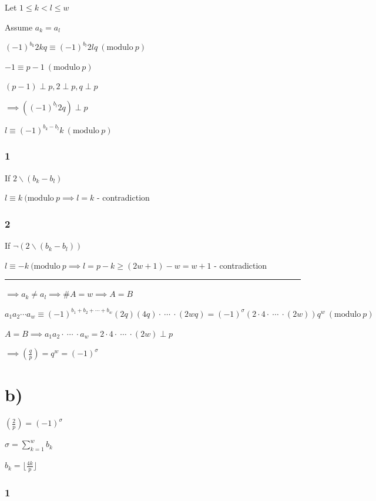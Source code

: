 \documentclass{article}
\begin{document}
Let $1 \leq k < l \leq w$

Assume $a_k = a_l$

$(-1)^{b_k} 2kq \equiv (-1)^{b_l} 2lq \ (\mathrm{modulo}\ p)$

$-1 \equiv p - 1  \ (\mathrm{modulo}\ p)$

$(p - 1) \perp p, 2 \perp p, q \perp p$

$\implies ((-1)^{b_l} 2q) \perp p$

$l \equiv (-1)^{b_k-b_l}k \ (\mathrm{modulo}\ p)$

\subsubsection*{1}

If $2 \backslash (b_k - b_l)$

$l \equiv k \ (\mathrm{modulo}\ p \implies l = k$ - contradiction

\subsubsection*{2}

If $\lnot(2 \backslash (b_k - b_l))$

$l \equiv -k \ (\mathrm{modulo}\ p \implies l = p - k \geq (2w+1)-w = w + 1$ - contradiction

\bigskip\hrule\bigskip

$\implies a_k \neq a_l \implies \#A = w \implies A = B$

$a_1a_2\cdots a_w \equiv (-1)^{b_1+b_2+\cdots + b_w} (2q)(4q) \cdot\ \cdots\ \cdot (2wq) = (-1)^{\sigma} (2 \cdot 4 \cdot\ \cdots\ \cdot (2w))q^w \ (\mathrm{modulo}\ p)$

$A = B \implies a_1a_2 \cdot\ \cdots\ \cdot a_w = 2 \cdot 4 \cdot\ \cdots\ \cdot (2w) \perp p$

$\implies (\frac{q}{p}) = q^w = (-1)^\sigma$

\section*{b)}

$(\frac{2}{p}) = (-1)^\sigma$

$\sigma = \sum_{k=1}^w b_k$

$b_k = \lfloor{\frac{4k}{p}}\rfloor$

\subsubsection*{1}
\end{document}
